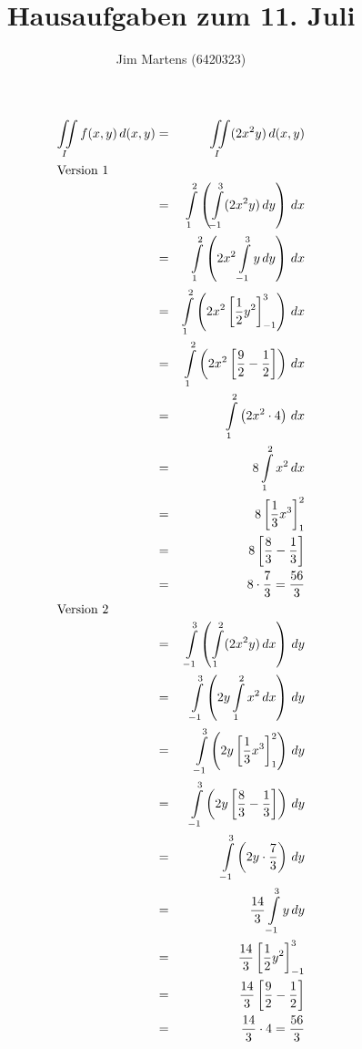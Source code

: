 \documentclass[10pt,a4paper,oneside,ngerman,numbers=noenddot]{scrartcl}
\begin{document}
\author{Jim Martens (6420323)}
\title{Hausaufgaben zum 11. Juli}
\maketitle
\section{} %
\begin{alignat*}{2}
\iint\limits_{I} f(x,y)\, d(x,y) &=& \iint\limits_{I} (2x^{2}y)\, d(x,y) \\
\intertext{Version 1}
&=& \int\limits_{1}^{2} \left( \int\limits_{-1}^{3} (2x^{2}y) \, dy \right) \, dx \\
&=& \int\limits_{1}^{2} \left( 2x^{2} \int\limits_{-1}^{3} y \, dy \right)\, dx \\
&=& \int\limits_{1}^{2} \left( 2x^{2} \left[\frac{1}{2}y^{2}\right]_{-1}^{3} \right)\, dx \\
&=& \int\limits_{1}^{2} \left( 2x^{2} \left[\frac{9}{2} - \frac{1}{2}\right] \right)\, dx \\
&=& \int\limits_{1}^{2} \left( 2x^{2} \cdot 4 \right)\, dx \\
&=& 8 \int\limits_{1}^{2} x^{2}\, dx \\
&=& 8 \left[\frac{1}{3}x^{3} \right]_{1}^{2} \\
&=& 8 \left[\frac{8}{3} - \frac{1}{3} \right] \\
&=& 8 \cdot \frac{7}{3} = \frac{56}{3} \\
\intertext{Version 2}
&=& \int\limits_{-1}^{3} \left( \int\limits_{1}^{2} (2x^{2}y) \, dx \right) \, dy \\
&=& \int\limits_{-1}^{3} \left( 2y\int\limits_{1}^{2} x^{2} \, dx \right) \, dy \\
&=& \int\limits_{-1}^{3} \left( 2y\left[\frac{1}{3}x^{3} \right]_{1}^{2} \right) \, dy \\
&=& \int\limits_{-1}^{3} \left( 2y\left[\frac{8}{3} - \frac{1}{3} \right] \right) \, dy \\
&=& \int\limits_{-1}^{3} \left( 2y \cdot \frac{7}{3} \right) \, dy \\
&=& \frac{14}{3}\int\limits_{-1}^{3} y  \, dy \\
&=& \frac{14}{3}\left[\frac{1}{2}y^{2}\right]_{-1}^{3} \\
&=& \frac{14}{3}\left[\frac{9}{2} - \frac{1}{2}\right] \\
&=& \frac{14}{3} \cdot 4 = \frac{56}{3}
\end{alignat*}
\section{} %
\end{document}
